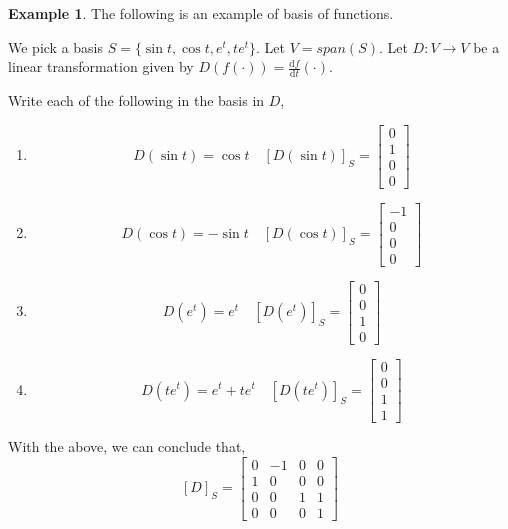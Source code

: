 \documentclass{report}
\theoremstyle{definition}
\newtheorem{ex}{Example}[section]
\theoremstyle{remark}
\begin{document}
\begin{ex}
The following is an example of basis of functions.

We pick a basis $S=\{\sin t, \cos t, e^t, te^t\}$.
Let $V=span(S)$.
Let $D:V\rightarrow V$ be a linear transformation given by $D(f(\cdot))=\frac{\mathrm{d}f}{\mathrm{d}t}(\cdot)$.

Write each of the following in the basis in $D$,
\begin{enumerate}
 \item \[
 D(\sin t)=\cos t \quad [D(\sin t)]_S=\begin{bmatrix}
 0 \\ 1 \\ 0 \\ 0
 \end{bmatrix}
 \]
 \item \[
 D(\cos t)=-\sin t \quad [D(\cos t)]_S=\begin{bmatrix}
 -1 \\ 0 \\ 0 \\ 0
 \end{bmatrix}
 \]
 \item \[
 D(e^t)=e^t \quad [D(e^t)]_S=\begin{bmatrix}
 0 \\ 0 \\ 1 \\ 0
 \end{bmatrix}
 \]
 \item \[
 D(te^t)=e^t+te^t \quad [D(te^t)]_S=\begin{bmatrix}
 0 \\ 0 \\ 1 \\ 1
 \end{bmatrix}
 \]
\end{enumerate}

With the above, we can conclude that,
\[
[D]_S=\begin{bmatrix}
0 & -1 & 0 & 0 \\
1 & 0 & 0 & 0 \\
0 & 0 & 1 & 1 \\
0 & 0 & 0 & 1
\end{bmatrix}
\]


\end{ex}
\end{document}
